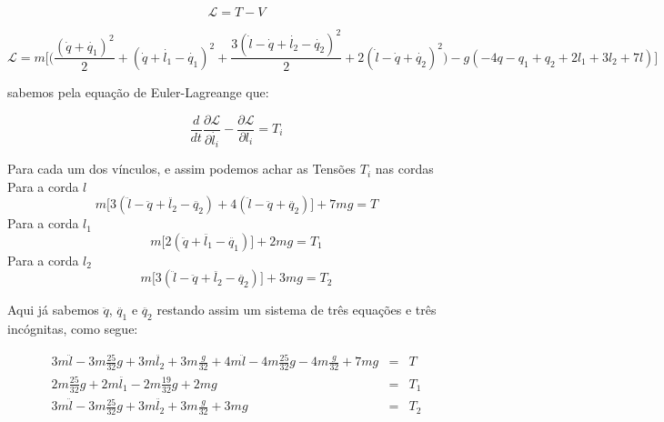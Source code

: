 \documentclass[a4paper,12pt]{exam}
\begin{document}
	\[ \mathcal{L} = T - V \]
	
	\[ \mathcal{L} = m\Bigg[\Big(\frac{(\dot{q}+\dot{q_1})^2}{2} + ( \dot{q}+\dot{l_1} - \dot{q_1})^2 + \frac{3(\dot{l}-\dot{q}+\dot{l_2}-\dot{q_2})^2}{2} + 2(\dot{l}- \dot{q}+\dot{q_2})^2 \Big) - g( -4q -q_1 + q_2 + 2l_1 + 3l_2 + 7l ) \Bigg] \]
	
	sabemos pela equação de Euler-Lagreange que:
	
	\[ \frac{d}{dt}\frac{\partial \mathcal{L}}{\partial \dot{l_i}} -\frac{\partial \mathcal{L}}{\partial l_i} = T_i\]
	
	Para cada um dos vínculos, e assim podemos achar as Tensões $T_i$ nas cordas
	\\
	Para a corda $l$
	\[ m \Big[ 3(\ddot{l} -\ddot{q} + \ddot{l_2} - \ddot{q_2}) + 4(\ddot{l} - \ddot{q} + \ddot{q_2}) \Big]  +7mg = T \]
	Para a corda $l_1$
	\[ m\Big[ 2(\ddot{q} + \ddot{l_1} - \ddot{q_1}) \Big] +2mg = T_1\]
	Para a corda $l_2$
	\[ m\Big[ 3(\ddot{l} - \ddot{q} + \ddot{l_2} - \ddot{q_2}) \Big] + 3mg = T_2\]
	
	Aqui já sabemos $\ddot{q}$, $\ddot{q_1}$ e $\ddot{q_2}$ restando assim um sistema de três equações e três incógnitas, como segue:
	
	\[
		\begin{array}{rcl}
			3m\ddot{l} -3m\frac{25}{32}g + 3m\ddot{l_2} + 3m\frac{g}{32} + 4m\ddot{l} - 4m\frac{25}{32}g -4m\frac{g}{32} +7mg &=& T \\
			2m\frac{25}{32}g + 2m\ddot{l_1} - 2m\frac{19}{32}g + 2mg &=& T_1 \\
			3m\ddot{l} -3m\frac{25}{32}g + 3m\ddot{l_2} + 3m\frac{g}{32}+ 3mg &=& T_2 \\
		\end{array}
	\]
	
	
\end{document}
